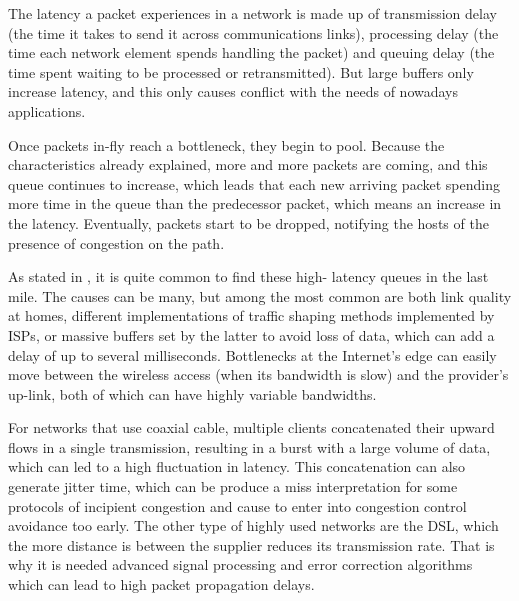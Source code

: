The latency a packet experiences in a network is made up of transmission
delay (the time it takes to send it across communications links), processing
delay (the time each network element spends handling the packet) and queuing
delay (the time spent waiting to be processed or retransmitted). But large
buffers only increase latency, and this only causes conflict with the needs
of nowadays applications.

Once packets in-fly reach a bottleneck, they begin to pool. Because the
characteristics already explained, more and more packets are coming, and this
queue continues to increase, which leads that each new arriving packet spending
more time in the queue than the predecessor packet, which means an
increase in the latency. Eventually, packets start to be dropped,
notifying the hosts of the presence of congestion on the path.

As stated in \cite{Dischinger2007CRB}, it is quite common to find these high-
latency queues in the last mile. The causes can be many, but among the most
common are both link quality at homes, different implementations of traffic
shaping methods implemented by ISPs, or massive buffers set by the latter to
avoid loss of data, which can add a delay of up to several milliseconds.
Bottlenecks at the Internet's edge can easily move between the wireless
access (when its bandwidth is slow) and the provider's up-link, both of which
can have highly variable bandwidths.

For networks that use coaxial cable, multiple clients concatenated their
upward flows in a single transmission, resulting in a burst with a large
volume of data, which can led to a high fluctuation in latency. This
concatenation can also generate jitter time, which can be produce a miss
interpretation for some protocols of incipient congestion and cause to enter
into congestion control avoidance too early. The other type of highly used
networks are the DSL, which the more distance is between the supplier reduces
its transmission rate. That is why it is needed advanced signal processing and
error correction algorithms which can lead to high packet propagation delays.
